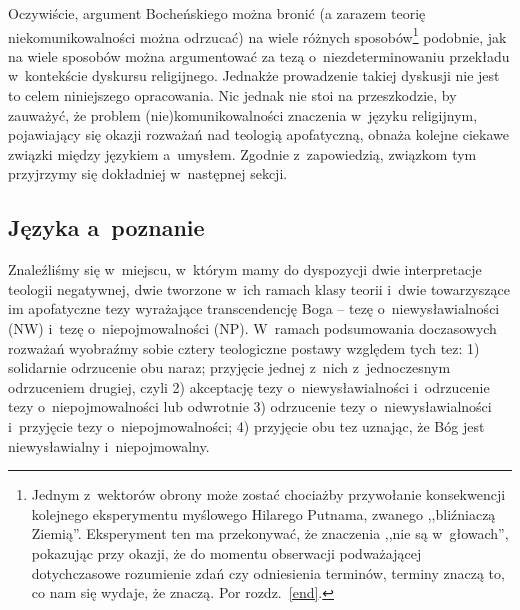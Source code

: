 Oczywiście, argument Bocheńskiego można bronić (a zarazem teorię niekomunikowalności można odrzucać) na wiele różnych sposobów\footnote{Jednym z~wektorów obrony może zostać chociażby przywołanie konsekwencji kolejnego eksperymentu myślowego Hilarego Putnama, zwanego ,,bliźniaczą Ziemią''. Eksperyment ten ma przekonywać, że znaczenia ,,nie są w~głowach'', pokazując przy okazji, że do momentu obserwacji podważającej dotychczasowe rozumienie zdań czy odniesienia terminów, terminy znaczą to, co nam się wydaje, że znaczą. Por rozdz.~\ref{end}.} podobnie, jak na wiele sposobów można argumentować za tezą o~niezdeterminowaniu przekładu w~kontekście dyskursu religijnego. Jednakże prowadzenie takiej dyskusji nie jest to celem niniejszego opracowania. Nic jednak nie stoi na przeszkodzie, by zauważyć, że problem (nie)komunikowalności znaczenia w~języku religijnym, pojawiający się okazji rozważań nad teologią apofatyczną, obnaża kolejne ciekawe związki między językiem a~umysłem. Zgodnie z~zapowiedzią, związkom tym przyjrzymy się dokładniej w~następnej sekcji.

\subsection{Języka a~poznanie}

Znaleźliśmy się w~miejscu, w~którym mamy do dyspozycji dwie interpretacje teologii negatywnej, dwie tworzone w~ich ramach klasy teorii i~dwie towarzyszące im apofatyczne tezy wyrażające transcendencję Boga -- tezę o~niewysławialności (NW) i~tezę o~niepojmowalności (NP). W~ramach podsumowania doczasowych rozważań wyobraźmy sobie cztery teologiczne postawy względem tych tez: 1) solidarnie odrzucenie obu naraz; przyjęcie jednej z~nich z~jednoczesnym odrzuceniem drugiej, czyli 2) akceptację tezy o~niewysławialności i~odrzucenie tezy o~niepojmowalności lub odwrotnie 3) odrzucenie tezy o~niewysławialności i~przyjęcie tezy o~niepojmowalności; 4) przyjęcie obu tez uznając, że Bóg jest niewysławialny i~niepojmowalny.

